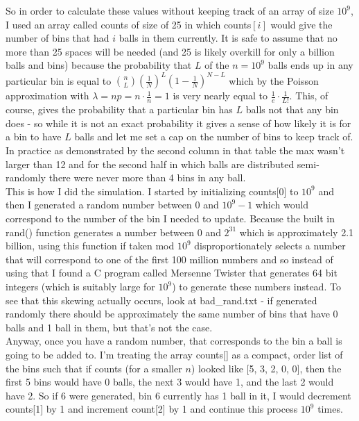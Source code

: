 \documentclass{article}
\begin{document}
\begin{enumerate}
	So in order to calculate these values without keeping track of an array of size $10^9$, I used an array called counts of size of 25 in which counts$[i]$ would give the number of bins that had $i$ balls in them currently.  It is safe to assume that no more than 25 spaces will be needed (and 25 is likely overkill for only a billion balls and bins) because the probability that $L$ of the $n = 10 ^ 9$ balls ends up in any particular bin is equal to ${n\choose L}(\frac{1}{N})^L(1 - \frac{1}{N})^{N-L}$ which by the Poisson approximation with $\lambda = np = n \cdot \frac{1}{n} = 1$ is very nearly equal to $\frac{1}{e}\cdot\frac{1}{L!}$.  This, of course, gives the probability that a particular bin has $L$ balls not that any bin does - so while it is not an exact probability it gives a sense of how likely it is for a bin to have $L$ balls and let me set a cap on the number of bins to keep track of.  In practice as demonstrated by the second column in that table the max wasn't larger than 12 and for the second half in which balls are distributed semi-randomly there were never more than 4 bins in any ball.  \\
	
	This is how I did the simulation. I started by initializing counts[0] to $10^9$ and then I generated a random number between 0 and $10^9 - 1$ which would correspond to the number of the bin I needed to update.  Because the built in rand() function generates a number between 0 and $2^{31}$ which is approximately 2.1 billion, using this function if taken mod $10^9$ disproportionately selects a number that will correspond to one of the first 100 million numbers and so instead of using that I found a C program called Mersenne Twister that generates 64 bit integers (which is suitably large for $10^9$) to generate these numbers instead.  To see that this skewing actually occurs, look at bad\_rand.txt - if generated randomly there should be approximately the same number of bins that have 0 balls and 1 ball in them, but that's not the case.  \\
	
	Anyway, once you have a random number, that corresponds to the bin a ball is going to be added to.  I'm treating the array counts[] as a compact, order list of the bins such that if counts (for a smaller $n$) looked like [5, 3, 2, 0, 0], then the first 5 bins would have 0 balls, the next 3 would have 1, and the last 2 would have 2.  So if 6 were generated, bin 6 currently has 1 ball in it, I would decrement counts[1] by 1 and increment count[2] by 1 and continue this process $10^9$ times.  \\
	

\end{enumerate}
\end{document}
